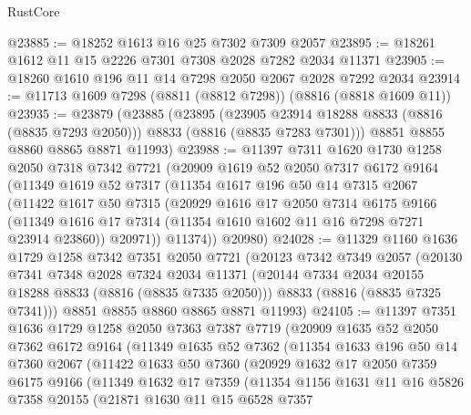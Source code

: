\begin{lexlean}{RustCore}
\begin{coremodule}
@23885 := @18252 @1613 @16 @25 @7302 @7309 @2057
@23895 := @18261 @1612 @11 @15 @2226 @7301 @7308 @2028 @7282 @2034 @11371
@23905 := @18260 @1610 @196 @11 @14 @7298 @2050 @2067 @2028 @7292 @2034
@23914 := @11713 @1609 @7298 (@8811 (@8812 @7298)) (@8816 (@8818 @1609 @11))
@23935 := @23879
    (@23885
      (@23895
        (@23905 @23914 @18288 @8833 (@8816 (@8835 @7293 @2050)))
        @8833
        (@8816 (@8835 @7283 @7301)))
      @8851
      @8855
      @8860
      @8865
      @8871
      @11993)
@23988 := @11397
    @7311
    @1620
    @1730
    @1258
    @2050
    @7318
    @7342
    @7721
    (@20909
      @1619
      @52
      @2050
      @7317
      @6172
      @9164
      (@11349
        @1619
        @52
        @7317
        (@11354
          @1617
          @196
          @50
          @14
          @7315
          @2067
          (@11422
            @1617
            @50
            @7315
            (@20929
              @1616
              @17
              @2050
              @7314
              @6175
              @9166
              (@11349 @1616 @17 @7314 (@11354 @1610 @1602 @11 @16 @7298 @7271 @23914 @23860))
              @20971))
          @11374))
      @20980)
@24028 := @11329
    @1160
    @1636
    @1729
    @1258
    @7342
    @7351
    @2050
    @7721
    (@20123
      @7342
      @7349
      @2057
      (@20130
        @7341
        @7348
        @2028
        @7324
        @2034
        @11371
        (@20144 @7334 @2034 @20155 @18288 @8833 (@8816 (@8835 @7335 @2050)))
        @8833
        (@8816 (@8835 @7325 @7341)))
      @8851
      @8855
      @8860
      @8865
      @8871
      @11993)
@24105 := @11397
    @7351
    @1636
    @1729
    @1258
    @2050
    @7363
    @7387
    @7719
    (@20909
      @1635
      @52
      @2050
      @7362
      @6172
      @9164
      (@11349
        @1635
        @52
        @7362
        (@11354
          @1633
          @196
          @50
          @14
          @7360
          @2067
          (@11422
            @1633
            @50
            @7360
            (@20929
              @1632
              @17
              @2050
              @7359
              @6175
              @9166
              (@11349
                @1632
                @17
                @7359
                (@11354
                  @1156
                  @1631
                  @11
                  @16
                  @5826
                  @7358
                  @20155
                  (@21871
                    @1630
                    @11
                    @15
                    @6528
                    @7357

\end{coremodule}
\end{lexlean}

